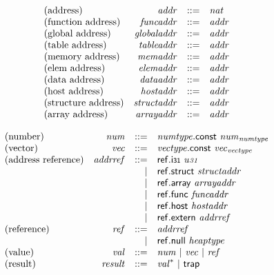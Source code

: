 $$
\begin{array}{@{}lrrl@{}l@{}}
\mbox{(address)} & {\mathit{addr}} &::=& {\mathit{nat}} \\
\mbox{(function address)} & {\mathit{funcaddr}} &::=& {\mathit{addr}} \\
\mbox{(global address)} & {\mathit{globaladdr}} &::=& {\mathit{addr}} \\
\mbox{(table address)} & {\mathit{tableaddr}} &::=& {\mathit{addr}} \\
\mbox{(memory address)} & {\mathit{memaddr}} &::=& {\mathit{addr}} \\
\mbox{(elem address)} & {\mathit{elemaddr}} &::=& {\mathit{addr}} \\
\mbox{(data address)} & {\mathit{dataaddr}} &::=& {\mathit{addr}} \\
\mbox{(host address)} & {\mathit{hostaddr}} &::=& {\mathit{addr}} \\
\mbox{(structure address)} & {\mathit{structaddr}} &::=& {\mathit{addr}} \\
\mbox{(array address)} & {\mathit{arrayaddr}} &::=& {\mathit{addr}} \\
\end{array}
$$

\vspace{1ex}

\vspace{1ex}

$$
\begin{array}{@{}lrrl@{}l@{}}
\mbox{(number)} & {\mathit{num}} &::=& {\mathit{numtype}}.\mathsf{const}~{{\mathit{num}}}_{{\mathit{numtype}}} \\
\mbox{(vector)} & {\mathit{vec}} &::=& {\mathit{vectype}}.\mathsf{const}~{{\mathit{vec}}}_{{\mathit{vectype}}} \\
\mbox{(address reference)} & {\mathit{addrref}} &::=& \mathsf{ref.i{\scriptstyle31}}~{\mathit{u{\scriptstyle31}}} \\ &&|&
\mathsf{ref.struct}~{\mathit{structaddr}} \\ &&|&
\mathsf{ref.array}~{\mathit{arrayaddr}} \\ &&|&
\mathsf{ref.func}~{\mathit{funcaddr}} \\ &&|&
\mathsf{ref.host}~{\mathit{hostaddr}} \\ &&|&
\mathsf{ref.extern}~{\mathit{addrref}} \\
\mbox{(reference)} & {\mathit{ref}} &::=& {\mathit{addrref}} \\ &&|&
\mathsf{ref.null}~{\mathit{heaptype}} \\
\mbox{(value)} & {\mathit{val}} &::=& {\mathit{num}} ~|~ {\mathit{vec}} ~|~ {\mathit{ref}} \\
\mbox{(result)} & {\mathit{result}} &::=& {{\mathit{val}}^\ast} ~|~ \mathsf{trap} \\
\end{array}
$$

